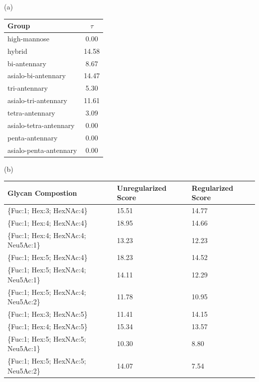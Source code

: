     \begin{table}
        \begin{minipage}[t]{0.25\linewidth}
            \vspace{0pt}
            (a)
            \centering
            
    \begin{tabular}{l | c}
        Group & $\tau$ \\
        \hline
        high-mannose & 0.00 \\
        hybrid & 14.58 \\
        bi-antennary & 8.67 \\
        asialo-bi-antennary & 14.47 \\
        tri-antennary & 5.30 \\
        asialo-tri-antennary & 11.61 \\
        tetra-antennary & 3.09 \\
        asialo-tetra-antennary & 0.00 \\
        penta-antennary & 0.00 \\
        asialo-penta-antennary & 0.00 \\
    \end{tabular}
    
            
        \end{minipage}
        \hspace{1cm}
        \begin{minipage}[t]{0.55\linewidth}
            \vspace{0pt}
            (b)
            \centering
            
    \begin{footnotesize}
    \begin{tabular}{l|p{2cm} p{2cm}}
Glycan Compostion &  Unregularized Score &  Regularized Score \\
\hline
\{Fuc:1; Hex:3; HexNAc:4\}           &                15.51 &              14.77 \\
\{Fuc:1; Hex:4; HexNAc:4\}           &                18.95 &              14.66 \\
\{Fuc:1; Hex:4; HexNAc:4; Neu5Ac:1\} &                13.23 &              12.23 \\
\{Fuc:1; Hex:5; HexNAc:4\}           &                18.23 &              14.52 \\
\{Fuc:1; Hex:5; HexNAc:4; Neu5Ac:1\} &                14.11 &              12.29 \\
\{Fuc:1; Hex:5; HexNAc:4; Neu5Ac:2\} &                11.78 &              10.95 \\
\{Fuc:1; Hex:3; HexNAc:5\}           &                11.41 &              14.15 \\
\{Fuc:1; Hex:4; HexNAc:5\}           &                15.34 &              13.57 \\
\{Fuc:1; Hex:5; HexNAc:5; Neu5Ac:1\} &                10.30 &               8.80 \\
\{Fuc:1; Hex:5; HexNAc:5; Neu5Ac:2\} &                14.07 &               7.54 \\
\end{tabular}


\end{footnotesize}
\end{minipage}
\end{table}
